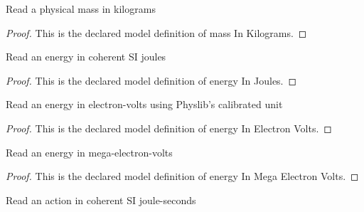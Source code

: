 \begin{definition}
  \label{def:physics:phyx-mini-0660:phyxminiproblems-problemphyxmini0660-massinkilograms}
  Read a physical mass in kilograms
\end{definition}
\begin{proof}
  This is the declared model definition of mass In Kilograms.
\end{proof}
\begin{definition}
  \label{def:physics:phyx-mini-0660:phyxminiproblems-problemphyxmini0660-energyinjoules}
  Read an energy in coherent SI joules
\end{definition}
\begin{proof}
  This is the declared model definition of energy In Joules.
\end{proof}
\begin{definition}
  \label{def:physics:phyx-mini-0660:phyxminiproblems-problemphyxmini0660-energyinelectronvolts}
  Read an energy in electron-volts using Physlib's calibrated unit
\end{definition}
\begin{proof}
  This is the declared model definition of energy In Electron Volts.
\end{proof}
\begin{definition}
  \label{def:physics:phyx-mini-0660:phyxminiproblems-problemphyxmini0660-energyinmegaelectronvolts}
  Read an energy in mega-electron-volts
\end{definition}
\begin{proof}
  This is the declared model definition of energy In Mega Electron Volts.
\end{proof}
\begin{definition}
  \label{def:physics:phyx-mini-0660:phyxminiproblems-problemphyxmini0660-actioninjouleseconds}
  Read an action in coherent SI joule-seconds
\end{definition}

